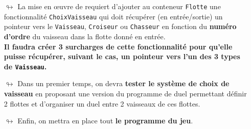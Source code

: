 \documentclass[10pt, fleqn, a4paper]{article}
\newcommand{\bfcolor}[2]{\textcolor{#1}{\textbf{#2}}}
\newcommand{\itcolor}[2]{\textcolor{#1}{\textit{#2}}}
\begin{document}
\begin{itemize}
\item[$\looparrowright$] La mise en œuvre de requiert d'ajouter au conteneur \texttt{Flotte} une fonctionnalité \texttt{ChoixVaisseau} qui doit récupérer (en entrée/sortie) un pointeur vers le \texttt{Vaisseau}, \texttt{Croiseur} ou \texttt{Chasseur} en fonction du \textbf{numéro d'ordre} du vaisseau dans la flotte donné en entrée.\\
\bfcolor{redCM}{Il faudra créer 3 surcharges de cette fonctionnalité pour qu'elle puisse récupérer, suivant le cas, un pointeur vers l'un des 3 types de \texttt{Vaisseau}.}
\item[$\looparrowright$] Dans un premier temps, on devra \bfcolor{greenC2}{tester le système de choix de vaisseau} en proposant une version  du programme de duel permettant définir 2 flottes et d'organiser un duel entre 2 vaisseaux de ces flottes.
\item[$\looparrowright$] Enfin, on mettra en place tout \bfcolor{blueTD}{le programme du jeu}.
\end{itemize}


\end{document}
